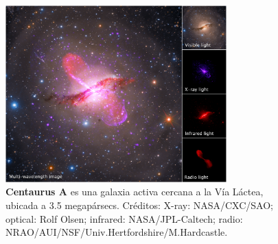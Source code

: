 \begin{frame}{}
\begin{columns}
\begin{column}{0.5\textwidth}
            \end{column}

            \begin{column}{0.5\textwidth}
                \centering

                \vspace*{0.3cm} %
                \begin{figure}
                    \centering
				    \includegraphics[width=0.8\textwidth]{Figures/centaurusA_multiwavelength.png}
				    \caption{\tiny \textbf{Centaurus A} es una galaxia activa cercana a la Vía Láctea, ubicada a 3.5 megapársecs. Créditos: X-ray: NASA/CXC/SAO; optical: Rolf Olsen; infrared: NASA/JPL-Caltech; radio: NRAO/AUI/NSF/Univ.Hertfordshire/M.Hardcastle.}
                \end{figure}            
            \end{column}
        \end{columns}
    \end{frame}  


